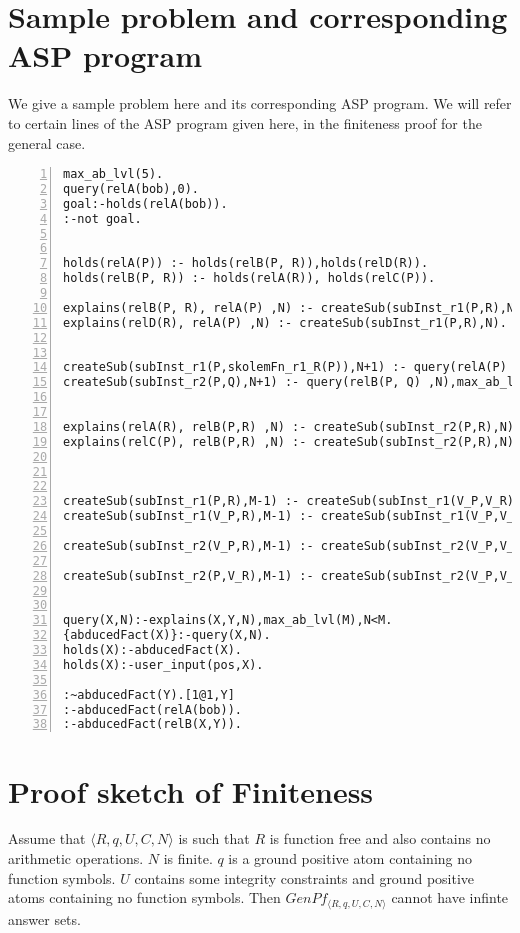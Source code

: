 \documentclass[sigconf]{acmart}
\begin{document}
\section{Sample problem and corresponding ASP program}\label{sec:sample_problem}
We give a sample problem here and its corresponding ASP program. We will refer to certain lines of the ASP program given here, in the finiteness proof for the general case. 
\begin{lstlisting}[numbers=left]
max_ab_lvl(5).
query(relA(bob),0).
goal:-holds(relA(bob)).
:-not goal.


holds(relA(P)) :- holds(relB(P, R)),holds(relD(R)).
holds(relB(P, R)) :- holds(relA(R)), holds(relC(P)).

explains(relB(P, R), relA(P) ,N) :- createSub(subInst_r1(P,R),N).
explains(relD(R), relA(P) ,N) :- createSub(subInst_r1(P,R),N).


createSub(subInst_r1(P,skolemFn_r1_R(P)),N+1) :- query(relA(P) ,N),max_ab_lvl(M),N<M-1.
createSub(subInst_r2(P,Q),N+1) :- query(relB(P, Q) ,N),max_ab_lvl(M),N<M-1.


explains(relA(R), relB(P,R) ,N) :- createSub(subInst_r2(P,R),N).
explains(relC(P), relB(P,R) ,N) :- createSub(subInst_r2(P,R),N).



createSub(subInst_r1(P,R),M-1) :- createSub(subInst_r1(V_P,V_R),N), holds(relB(P, R)),max_ab_lvl(M).
createSub(subInst_r1(V_P,R),M-1) :- createSub(subInst_r1(V_P,V_R),N), holds(relD(R)),max_ab_lvl(M).

createSub(subInst_r2(V_P,R),M-1) :- createSub(subInst_r2(V_P,V_R),N), holds(relA(R)),max_ab_lvl(M).

createSub(subInst_r2(P,V_R),M-1) :- createSub(subInst_r2(V_P,V_R),N), holds(relC(P)),max_ab_lvl(M).


query(X,N):-explains(X,Y,N),max_ab_lvl(M),N<M.
{abducedFact(X)}:-query(X,N).
holds(X):-abducedFact(X).
holds(X):-user_input(pos,X).

:~abducedFact(Y).[1@1,Y]
:-abducedFact(relA(bob)).
:-abducedFact(relB(X,Y)).

\end{lstlisting}

\section{Proof sketch of Finiteness}\label{sec:proof_finiteness}

\begin{theorem}[Finiteness]\label{thm:finiteness}
Assume that $\langle R,q,U,C,N \rangle$ is such that $R$ is function free and
also contains no arithmetic operations. $N$ is finite. $q$ is a ground
positive atom containing no function symbols. $U$ contains some integrity
constraints and ground positive atoms containing no function symbols. Then
$GenPf_{\langle R,q,U,C,N \rangle}$ cannot have infinte answer sets. 
\end{theorem}
\end{document}
